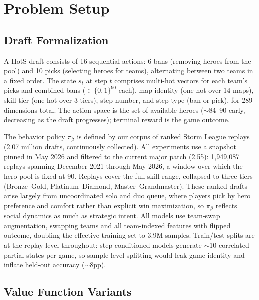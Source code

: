 \documentclass[journal]{IEEEtran}
\begin{document}
\section{Problem Setup}
\label{sec:setup}

\subsection{Draft Formalization}

A HotS draft consists of 16 sequential actions: 6 bans (removing heroes from the pool) and 10 picks (selecting heroes for teams), alternating between two teams in a fixed order. The state $s_t$ at step $t$ comprises multi-hot vectors for each team's picks and combined bans ($\in \{0,1\}^{90}$ each), map identity (one-hot over 14 maps), skill tier (one-hot over 3 tiers), step number, and step type (ban or pick), for 289 dimensions total. The action space is the set of available heroes ($\sim$84--90 early, decreasing as the draft progresses); terminal reward is the game outcome.

The behavior policy $\pi_\beta$ is defined by our corpus of ranked Storm League replays (2.07 million drafts, continuously collected). All experiments use a snapshot pinned in May 2026 and filtered to the current major patch (2.55): 1,949,087 replays spanning December 2021 through May 2026, a window over which the hero pool is fixed at 90. Replays cover the full skill range, collapsed to three tiers (Bronze--Gold, Platinum--Diamond, Master--Grandmaster). These ranked drafts arise largely from uncoordinated solo and duo queue, where players pick by hero preference and comfort rather than explicit win maximization, so $\pi_\beta$ reflects social dynamics as much as strategic intent. All models use team-swap augmentation, swapping teams and all team-indexed features with flipped outcome, doubling the effective training set to 3.9M samples. Train/test splits are at the replay level throughout: step-conditioned models generate $\sim$10 correlated partial states per game, so sample-level splitting would leak game identity and inflate held-out accuracy ($\sim$8pp).

\subsection{Value Function Variants}
\end{document}

